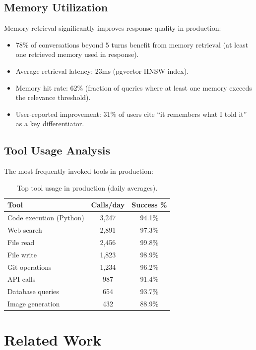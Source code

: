 \documentclass[11pt,twocolumn]{article}
\begin{document}
\subsection{Memory Utilization}

Memory retrieval significantly improves response quality in production:

\begin{itemize}[leftmargin=1.1em]
    \item 78\% of conversations beyond 5 turns benefit from memory retrieval (at least one retrieved memory used in response).
    \item Average retrieval latency: 23ms (pgvector HNSW index).
    \item Memory hit rate: 62\% (fraction of queries where at least one memory exceeds the relevance threshold).
    \item User-reported improvement: 31\% of users cite ``it remembers what I told it'' as a key differentiator.
\end{itemize}

\subsection{Tool Usage Analysis}

The most frequently invoked tools in production:

\begin{table}[H]
\centering
\small
\begin{tabular}{lcc}
\toprule
\textbf{Tool} & \textbf{Calls/day} & \textbf{Success \%} \\
\midrule
Code execution (Python) & 3,247 & 94.1\% \\
Web search & 2,891 & 97.3\% \\
File read & 2,456 & 99.8\% \\
File write & 1,823 & 98.9\% \\
Git operations & 1,234 & 96.2\% \\
API calls & 987 & 91.4\% \\
Database queries & 654 & 93.7\% \\
Image generation & 432 & 88.9\% \\
\bottomrule
\end{tabular}
\caption{Top tool usage in production (daily averages).}
\label{tab:tool_usage}
\end{table}

\section{Related Work}
\label{sec:related}
\end{document}
